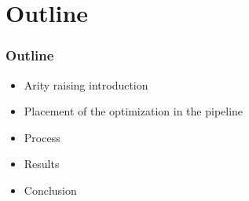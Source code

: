 \section{Outline}

\begin{frame}
\frametitle{Outline}

\begin{itemize}
\item Arity raising introduction
\item Placement of the optimization in the pipeline
\item Process
\item Results
\item Conclusion
\end{itemize}

\end{frame}

